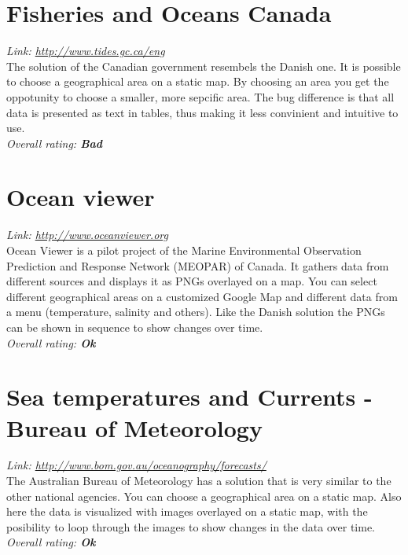 \documentclass[11pt,a4paper,titlepage,oneside]{report}
\begin{document}
  \section{Fisheries and Oceans Canada}
  \emph{Link: \url{http://www.tides.gc.ca/eng}} \\%
    The solution of the Canadian government resembels the Danish one. It is possible to choose a geographical area on a static map. By choosing an area you get the oppotunity to choose a smaller, more sepcific area. The bug difference is that all data is presented as text in tables, thus making it less convinient and intuitive to use.
  \\ \emph{Overall rating: \textbf{Bad}}

  \section{Ocean viewer}
  \emph{Link: \url{http://www.oceanviewer.org}} \\%
    Ocean Viewer is a pilot project of the Marine Environmental Observation Prediction and Response Network (MEOPAR) of Canada. It gathers data from different sources and displays it as PNGs overlayed on a map. You can select different geographical areas on a customized Google Map and different data from a menu (temperature, salinity and others). Like the Danish solution the PNGs can be shown in sequence to show changes over time.
  \\ \emph{Overall rating: \textbf{Ok}}

  \section{Sea temperatures and Currents - Bureau of Meteorology}
  \emph{Link: \url{http://www.bom.gov.au/oceanography/forecasts/}} \\%
    The Australian Bureau of Meteorology has a solution that is very similar to the other national agencies. You can choose a geographical area on a static map. Also here the data is visualized with images overlayed on a static map, with the posibility to loop through the images to show changes in the data over time.
  \\ \emph{Overall rating: \textbf{Ok}}
  
\end{document}
